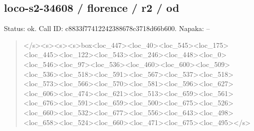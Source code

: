 \documentclass[10pt,a4paper]{article}
\begin{document}
\subsection*{loco-s2-34608 / florence / r2 / od}
Status: ok. Call ID: c8833f77412242388678c3718d66b600. Napaka: --
\begin{quote}\footnotesize
</s>\allowbreak{}<s>\allowbreak{}<s>\allowbreak{}<s>\allowbreak{}box<loc\_447>\allowbreak{}<loc\_40\allowbreak{}>\allowbreak{}<loc\_545>\allowbreak{}<loc\_175>\allowbreak{}<loc\_445>\allowbreak{}<loc\allowbreak{}\_122>\allowbreak{}<loc\_543>\allowbreak{}<loc\_246>\allowbreak{}<loc\_448>\allowbreak{}\allowbreak{}<loc\_0>\allowbreak{}<loc\_546>\allowbreak{}<loc\_97>\allowbreak{}<loc\_536\allowbreak{}>\allowbreak{}<loc\_460>\allowbreak{}<loc\_600>\allowbreak{}<loc\_509>\allowbreak{}<loc\allowbreak{}\_536>\allowbreak{}<loc\_518>\allowbreak{}<loc\_591>\allowbreak{}<loc\_567>\allowbreak{}\allowbreak{}<loc\_537>\allowbreak{}<loc\_518>\allowbreak{}<loc\_573>\allowbreak{}<loc\_\allowbreak{}566>\allowbreak{}<loc\_570>\allowbreak{}<loc\_581>\allowbreak{}<loc\_596>\allowbreak{}<\allowbreak{}loc\_627>\allowbreak{}<loc\_606>\allowbreak{}<loc\_474>\allowbreak{}<loc\_6\allowbreak{}21>\allowbreak{}<loc\_513>\allowbreak{}<loc\_659>\allowbreak{}<loc\_561>\allowbreak{}<l\allowbreak{}oc\_676>\allowbreak{}<loc\_591>\allowbreak{}<loc\_659>\allowbreak{}<loc\_50\allowbreak{}0>\allowbreak{}<loc\_675>\allowbreak{}<loc\_526>\allowbreak{}<loc\_660>\allowbreak{}<lo\allowbreak{}c\_532>\allowbreak{}<loc\_677>\allowbreak{}<loc\_556>\allowbreak{}<loc\_643\allowbreak{}>\allowbreak{}<loc\_498>\allowbreak{}<loc\_658>\allowbreak{}<loc\_524>\allowbreak{}<loc\allowbreak{}\_660>\allowbreak{}<loc\_471>\allowbreak{}<loc\_675>\allowbreak{}<loc\_495>\allowbreak{}\allowbreak{}</s>\allowbreak{}
\end{quote}
\end{document}
